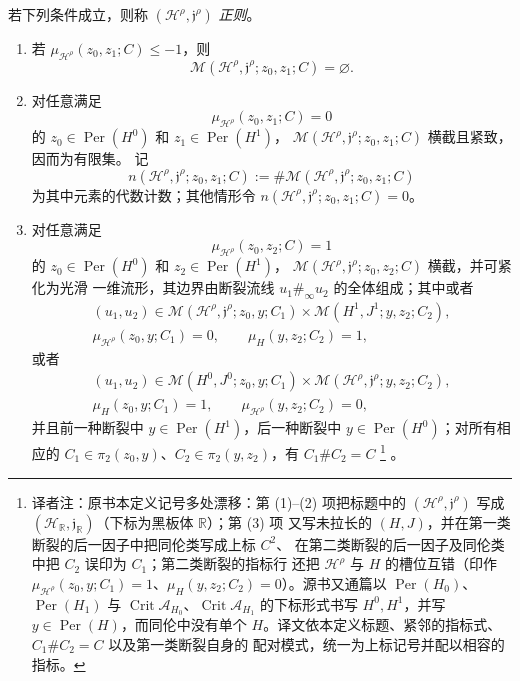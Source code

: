 \begin{definition}[链映射]
\label{def:floer-regular-continuation-data}
若下列条件成立，则称 $(\mathcal H^\rho,\mathfrak j^\rho)$ \emph{\personFloer{}正则}。
\begin{enumerate}[label=(\arabic*)]
\item 若 $\mu_{\mathcal H^\rho}(z_0,z_1;C)\leq-1$，则
\[
 \mathcal M(\mathcal H^\rho,\mathfrak j^\rho;z_0,z_1;C)=\varnothing.
\]
\item 对任意满足
\[
 \mu_{\mathcal H^\rho}(z_0,z_1;C)=0
\]
的 $z_0\in\operatorname{Per}(H^0)$ 和 $z_1\in\operatorname{Per}(H^1)$，
$\mathcal M(\mathcal H^\rho,\mathfrak j^\rho;z_0,z_1;C)$ 横截且紧致，因而为有限集。
记
\[
 n(\mathcal H^\rho,\mathfrak j^\rho;z_0,z_1;C)
 :=\#\mathcal M(\mathcal H^\rho,\mathfrak j^\rho;z_0,z_1;C)
\]
为其中元素的代数计数；其他情形令
$n(\mathcal H^\rho,\mathfrak j^\rho;z_0,z_1;C)=0$。
\item 对任意满足
\[
 \mu_{\mathcal H^\rho}(z_0,z_2;C)=1
\]
的 $z_0\in\operatorname{Per}(H^0)$ 和 $z_2\in\operatorname{Per}(H^1)$，
$\mathcal M(\mathcal H^\rho,\mathfrak j^\rho;z_0,z_2;C)$ 横截，并可紧化为光滑
一维流形，其边界由断裂流线 $u_1\#_\infty u_2$ 的全体组成；其中或者
\[
\begin{gathered}
 (u_1,u_2)\in
 \mathcal M(\mathcal H^\rho,\mathfrak j^\rho;z_0,y;C_1)
 \times\mathcal M(H^1,J^1;y,z_2;C_2),\\
 \mu_{\mathcal H^\rho}(z_0,y;C_1)=0,\qquad
 \mu_H(y,z_2;C_2)=1,
\end{gathered}
\]
或者
\[
\begin{gathered}
 (u_1,u_2)\in
 \mathcal M(H^0,J^0;z_0,y;C_1)
 \times\mathcal M(\mathcal H^\rho,\mathfrak j^\rho;y,z_2;C_2),\\
 \mu_H(z_0,y;C_1)=1,\qquad
 \mu_{\mathcal H^\rho}(y,z_2;C_2)=0,
\end{gathered}
\]
并且前一种断裂中 $y\in\operatorname{Per}(H^1)$，后一种断裂中
$y\in\operatorname{Per}(H^0)$；对所有相应的
$C_1\in\pi_2(z_0,y)$、$C_2\in\pi_2(y,z_2)$，有 $C_1\#C_2=C$
\footnote{译者注：原书本定义记号多处漂移：第 (1)--(2) 项把标题中的
$(\mathcal H^\rho,\mathfrak j^\rho)$ 写成 $(\mathcal H_{\mathbb R},\mathfrak j_{\mathbb R})$（下标为黑板体 $\mathbb R$）；第 (3) 项
又写未拉长的 $(H,J)$，并在第一类断裂的后一因子中把同伦类写成上标 $C^2$、
在第二类断裂的后一因子及同伦类中把 $C_2$ 误印为 $C_1$；第二类断裂的指标行
还把 $\mathcal H^\rho$ 与 $H$ 的槽位互错（印作
$\mu_{\mathcal H^\rho}(z_0,y;C_1)=1$、$\mu_H(y,z_2;C_2)=0$）。源书又通篇以
$\operatorname{Per}(H_0)$、$\operatorname{Per}(H_1)$ 与
$\operatorname{Crit}\mathcal A_{H_0}$、$\operatorname{Crit}\mathcal A_{H_1}$
的下标形式书写 $H^0,H^1$，并写 $y\in\operatorname{Per}(H)$，而同伦中没有单个
$H$。译文依本定义标题、紧邻的指标式、$C_1\#C_2=C$ 以及第一类断裂自身的
配对模式，统一为上标记号并配以相容的指标。}
。
\end{enumerate}
\end{definition}

